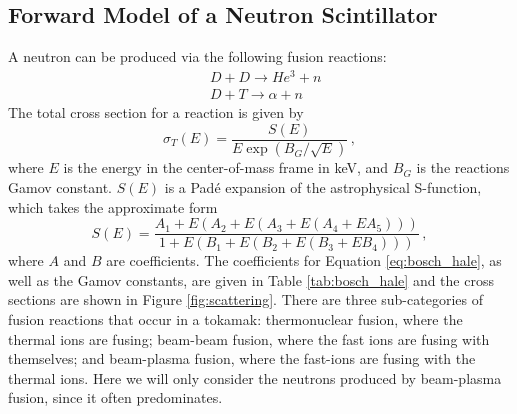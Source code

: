 \subsection{Forward Model of a Neutron Scintillator}
A neutron can be produced via the following fusion reactions:
\begin{equation}\label{eq:D_D}
\begin{split}
    &D + D \rightarrow He^3 + n\\
    &D + T \rightarrow \alpha + n
\end{split}
\end{equation}
The total cross section for a reaction is given by
\begin{equation}
        \sigma_T(E) = \frac{S(E)}{E\exp(B_G/\sqrt{E})}\,,
\end{equation}
where $E$ is the energy in the center-of-mass frame in keV, and $B_G$ is the reactions Gamov constant. $S(E)$ is a Pad\'{e} expansion of the astrophysical S-function, which takes the approximate form\cite{bosch1992,mfeformulary}
\begin{equation}\label{eq:bosch_hale}
    S(E) = \frac{A_1 + E(A_2 + E(A_3 + E(A_4 + E A_5)))}{1 + E(B_1 + E(B_2 + E(B_3 + E B_4)))}\,,
\end{equation}
where $A$ and $B$ are coefficients. The coefficients for Equation \ref{eq:bosch_hale}, as well as the Gamov constants, are given in Table \ref{tab:bosch_hale} and the cross sections are shown in Figure \ref{fig:scattering}.
There are three sub-categories of fusion reactions that occur in a tokamak: thermonuclear fusion, where the thermal ions are fusing; beam-beam fusion, where the fast ions are fusing with themselves; and beam-plasma fusion, where the fast-ions are fusing with the thermal ions. Here we will only consider the neutrons produced by beam-plasma fusion, since it often predominates.
